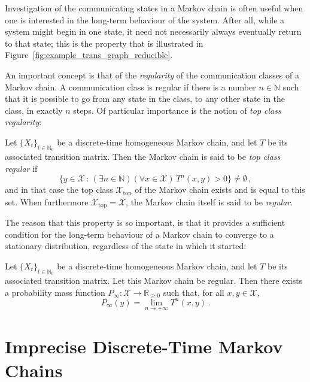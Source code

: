 \documentclass[graybox]{svmult}
\newcommand{\nats}{\mathbb{N}}
\newcommand{\natswith}{\nats_{0}}
\newcommand{\reals}{\mathbb{R}}
\newcommand{\realsnonneg}{\reals_{\geq 0}}
\newcommand{\states}{\mathcal{X}}
\begin{document}
Investigation of the communicating states in a Markov chain is often useful when one is interested in the long-term behaviour of the system. After all, while a system might begin in one state, it need not necessarily always eventually return to that state; this is the property that is illustrated in Figure~\ref{fig:example_trans_graph_reducible}.

An important concept is that of the \emph{regularity} of the communication classes of a Markov chain. A communication class is regular if there is a number $n\in\nats$ such that it is possible to go from any state in the class, to any other state in the class, in exactly $n$ steps. Of particular importance is the notion of \emph{top class regularity}:
\begin{definition}
Let $\{X_t\}_{t\in\natswith}$ be a discrete-time homogeneous Markov chain, and let $T$ be its associated transition matrix. Then the Markov chain is said to be \emph{top class regular} if
\begin{equation*}
\bigl\{ y\in\states\,:\,(\exists n\in\nats)(\forall x\in\states)\, T^n(x,y)>0 \bigr\} \neq \emptyset\,,
\end{equation*}
and in that case the top class $\states_\mathrm{top}$ of the Markov chain exists and is equal to this set. When furthermore $\states_\mathrm{top}=\states$, the Markov chain itself is said to be \emph{regular}.
\end{definition}
The reason that this property is so important, is that it provides a sufficient condition for the long-term behaviour of a Markov chain to converge to a stationary distribution, regardless of the state in which it started:
\begin{theorem}
Let $\{X_t\}_{t\in\natswith}$ be a discrete-time homogeneous Markov chain, and let $T$ be its associated transition matrix. Let this Markov chain be regular. Then there exists a probability mass function $P_\infty:\states\to\realsnonneg$ such that, for all $x,y\in\states$, 
\begin{equation*}
P_\infty(y) = \lim_{n\to+\infty}T^n(x,y)\,.
\end{equation*}
\end{theorem}

\section{Imprecise Discrete-Time Markov Chains}\label{sec:idtmc}

\end{document}
